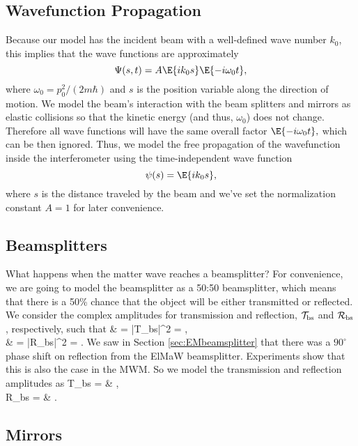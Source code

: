 \subsection{Wavefunction Propagation}

Because our model has the incident beam with a well-defined wave number $k_{0}$, this implies that the wave functions are approximately
%
\begin{equation}
\Psi(s,t) =  A\E{ik_{0}s}\E{-i\omega_{0}t},
\end{equation}
%
where $\omega_{0} = p_{0}^{2}/(2m\hbar)$ and $s$ is the position variable along the direction of motion.  We model the beam's interaction with the beam splitters and mirrors as elastic collisions so that the kinetic energy (and thus, $\omega_{0}$) does not change.  Therefore all wave functions will have the same overall factor $\E{-i\omega_{0}t},$ which can be then ignored.  Thus, we model the free propagation of the wavefunction inside the interferometer using the time-independent wave function
%
\begin{equation}
\psi(s) =  \E{ik_{0}s},
\end{equation}
%
where $s$ is the distance traveled by the beam and we've set the normalization constant $A = 1$ for later convenience.

\subsection{Beamsplitters}

What happens when the matter wave reaches a beamsplitter?  For convenience, we are going to model the beamsplitter as a 50:50 beamsplitter, which means that there is a 50\% chance that the object will be either transmitted or reflected.  We consider the complex amplitudes for transmission and reflection, ${\cal T}_{\rm bs}$ and ${\cal R}_{\rm bs}$, respectively, such that
%
\bas
{} & = |{\cal T}_{\rm bs}|^{2} = , \\
 & =  |{\cal R}_{\rm bs}|^{2} = .
\eas
%
We saw in Section \ref{sec:EMbeamsplitter} that there was a $90^\circ$ phase shift on reflection from the ElMaW beamsplitter.  Experiments show that this is also the case in the MWM. So we model the transmission and reflection amplitudes as
%
\bas
{\cal T}_{\rm bs} = & , \\
{\cal R}_{\rm bs} = & \frac{\I}{\stwo}.
\eas

\subsection{Mirrors}

